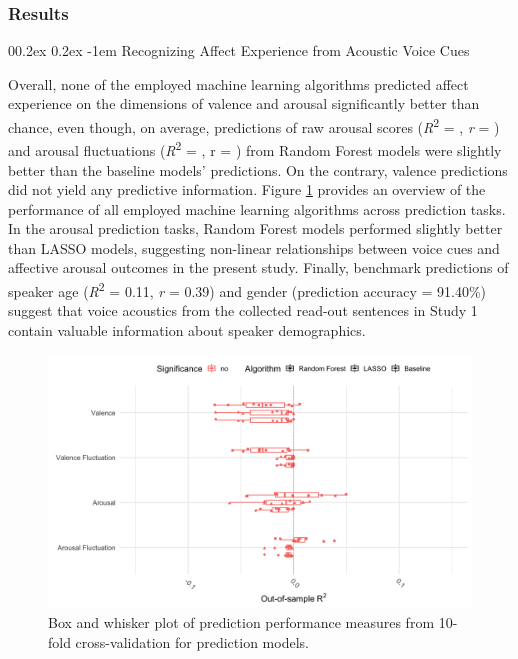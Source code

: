 \documentclass[
  man,floatsintext]{apa6}
\makeatletter
\let\oldparagraph\paragraph
\renewcommand{\paragraph}[1]{\oldparagraph{#1}\mbox{}}
\renewcommand{\paragraph}{\@startsection{paragraph}{4}{\parindent}%
  {0\baselineskip \@plus 0.2ex \@minus 0.2ex}%
  {-1em}%
  {\normalfont\normalsize\bfseries\itshape\typesectitle}}
\makeatother
\begin{document}
\hypertarget{results}{%
\subsubsection{Results}\label{results}}

\hypertarget{recognizing-affect-experience-from-acoustic-voice-cues}{%
\paragraph{Recognizing Affect Experience from Acoustic Voice Cues}\label{recognizing-affect-experience-from-acoustic-voice-cues}}

Overall, none of the employed machine learning algorithms predicted affect experience on the dimensions of valence and arousal significantly better than chance, even though, on average, predictions of raw arousal scores (\emph{R}\textsuperscript{2} = , \emph{r} = ) and arousal fluctuations (\emph{R}\textsuperscript{2} = , r = ) from Random Forest models were slightly better than the baseline models' predictions. On the contrary, valence predictions did not yield any predictive information. Figure \ref{fig:gerpredictionoverview} provides an overview of the performance of all employed machine learning algorithms across prediction tasks. In the arousal prediction tasks, Random Forest models performed slightly better than LASSO models, suggesting non-linear relationships between voice cues and affective arousal outcomes in the present study. Finally, benchmark predictions of speaker age (\emph{R}\textsuperscript{2} = 0.11, \emph{r} = 0.39) and gender (prediction accuracy = 91.40\%) suggest that voice acoustics from the collected read-out sentences in Study 1 contain valuable information about speaker demographics.

\begin{figure}

{\centering \includegraphics[width=1\linewidth,height=0.45\textheight]{../figures/bmr_ger_egemaps_plot} 

}

\caption[Prediction performance Study 1]{Box and whisker plot of prediction performance measures from 10-fold cross-validation for prediction models.}\label{fig:gerpredictionoverview}
\end{figure}
\end{document}
